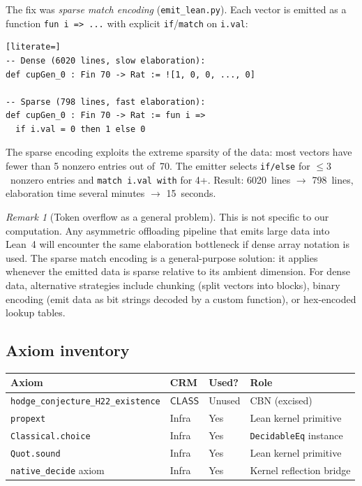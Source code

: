 \documentclass[11pt]{article}
\theoremstyle{plain}
\theoremstyle{definition}
\theoremstyle{remark}
\newtheorem{remark}[theorem]{Remark}
\newcommand{\CLASS}{\mathsf{CLASS}}
\begin{document}
The fix was \emph{sparse match encoding}
(\texttt{emit\_lean.py}).  Each vector is emitted as a function
\texttt{fun i => ...} with explicit \texttt{if}/\texttt{match}
on \texttt{i.val}:

\begin{lstlisting}[literate=]
-- Dense (6020 lines, slow elaboration):
def cupGen_0 : Fin 70 -> Rat := ![1, 0, 0, ..., 0]

-- Sparse (798 lines, fast elaboration):
def cupGen_0 : Fin 70 -> Rat := fun i =>
  if i.val = 0 then 1 else 0
\end{lstlisting}

\noindent
The sparse encoding exploits the extreme sparsity of the data:
most vectors have fewer than 5 nonzero entries out of~70.
The emitter selects \texttt{if/else} for $\leq 3$~nonzero
entries and \texttt{match i.val with} for 4+.  Result:
6020~lines $\to$ 798~lines, elaboration time
several minutes $\to$ 15~seconds.

\begin{remark}[Token overflow as a general problem]\label{rem:overflow}
This is not specific to our computation.  Any asymmetric
offloading pipeline that emits large data into Lean~4 will
encounter the same elaboration bottleneck if dense array notation
is used.  The sparse match encoding is a general-purpose solution:
it applies whenever the emitted data is sparse relative to its
ambient dimension.  For dense data, alternative strategies include
chunking (split vectors into blocks), binary encoding (emit data
as bit strings decoded by a custom function), or hex-encoded
lookup tables.
\end{remark}

\subsection{Axiom inventory}

\begin{center}
\begin{tabular}{llll}
\toprule
\textbf{Axiom} & \textbf{CRM} & \textbf{Used?} & \textbf{Role} \\
\midrule
\texttt{hodge\_conjecture\_H22\_existence} &
  $\CLASS$ & Unused & CBN (excised) \\
\texttt{propext} & Infra & Yes & Lean kernel primitive \\
\texttt{Classical.choice} & Infra & Yes & \texttt{DecidableEq} instance \\
\texttt{Quot.sound} & Infra & Yes & Lean kernel primitive \\
\texttt{native\_decide} axiom & Infra & Yes & Kernel reflection bridge \\
\bottomrule
\end{tabular}
\end{center}
\end{document}
